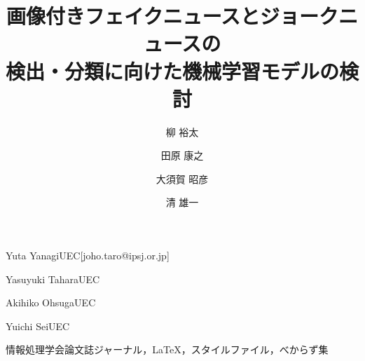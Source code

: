 \documentclass[submit]{ipsj}
\begin{document}
\title{画像付きフェイクニュースとジョークニュースの\\検出・分類に向けた機械学習モデルの検討}



\author{柳 裕太}{Yuta Yanagi}{UEC}[joho.taro@ipsj.or.jp]
\author{田原 康之}{Yasuyuki Tahara}{UEC}
\author{大須賀 昭彦}{Akihiko Ohsuga}{UEC}
\author{清 雄一}{Yuichi Sei}{UEC}



\begin{jkeyword}
情報処理学会論文誌ジャーナル，\LaTeX，スタイルファイル，べからず集
\end{jkeyword}

\maketitle












\end{document}
